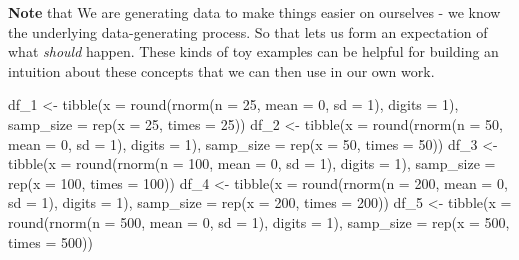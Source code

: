 \documentclass[
]{book}
\newenvironment{Shaded}{\begin{snugshade}}{\end{snugshade}}
\newcommand{\AttributeTok}[1]{\textcolor[rgb]{0.77,0.63,0.00}{#1}}
\newcommand{\DecValTok}[1]{\textcolor[rgb]{0.00,0.00,0.81}{#1}}
\newcommand{\FunctionTok}[1]{\textcolor[rgb]{0.00,0.00,0.00}{#1}}
\newcommand{\NormalTok}[1]{#1}
\newcommand{\OtherTok}[1]{\textcolor[rgb]{0.56,0.35,0.01}{#1}}
\begin{document}
\textbf{Note} that We are generating data to make things easier on ourselves - we know the underlying data-generating process. So that lets us form an expectation of what \emph{should} happen. These kinds of toy examples can be helpful for building an intuition about these concepts that we can then use in our own work.

\begin{Shaded}
\begin{Highlighting}[]
\NormalTok{df\_1 }\OtherTok{\textless{}{-}} \FunctionTok{tibble}\NormalTok{(}\AttributeTok{x =} \FunctionTok{round}\NormalTok{(}\FunctionTok{rnorm}\NormalTok{(}\AttributeTok{n =} \DecValTok{25}\NormalTok{, }\AttributeTok{mean =} \DecValTok{0}\NormalTok{, }\AttributeTok{sd =} \DecValTok{1}\NormalTok{), }\AttributeTok{digits =} \DecValTok{1}\NormalTok{), }\AttributeTok{samp\_size =} \FunctionTok{rep}\NormalTok{(}\AttributeTok{x =} \DecValTok{25}\NormalTok{, }\AttributeTok{times =} \DecValTok{25}\NormalTok{))}
\NormalTok{df\_2 }\OtherTok{\textless{}{-}} \FunctionTok{tibble}\NormalTok{(}\AttributeTok{x =} \FunctionTok{round}\NormalTok{(}\FunctionTok{rnorm}\NormalTok{(}\AttributeTok{n =} \DecValTok{50}\NormalTok{, }\AttributeTok{mean =} \DecValTok{0}\NormalTok{, }\AttributeTok{sd =} \DecValTok{1}\NormalTok{), }\AttributeTok{digits =} \DecValTok{1}\NormalTok{), }\AttributeTok{samp\_size =} \FunctionTok{rep}\NormalTok{(}\AttributeTok{x =} \DecValTok{50}\NormalTok{, }\AttributeTok{times =} \DecValTok{50}\NormalTok{))}
\NormalTok{df\_3 }\OtherTok{\textless{}{-}} \FunctionTok{tibble}\NormalTok{(}\AttributeTok{x =} \FunctionTok{round}\NormalTok{(}\FunctionTok{rnorm}\NormalTok{(}\AttributeTok{n =} \DecValTok{100}\NormalTok{, }\AttributeTok{mean =} \DecValTok{0}\NormalTok{, }\AttributeTok{sd =} \DecValTok{1}\NormalTok{), }\AttributeTok{digits =} \DecValTok{1}\NormalTok{), }\AttributeTok{samp\_size =} \FunctionTok{rep}\NormalTok{(}\AttributeTok{x =} \DecValTok{100}\NormalTok{, }\AttributeTok{times =} \DecValTok{100}\NormalTok{))}
\NormalTok{df\_4 }\OtherTok{\textless{}{-}} \FunctionTok{tibble}\NormalTok{(}\AttributeTok{x =} \FunctionTok{round}\NormalTok{(}\FunctionTok{rnorm}\NormalTok{(}\AttributeTok{n =} \DecValTok{200}\NormalTok{, }\AttributeTok{mean =} \DecValTok{0}\NormalTok{, }\AttributeTok{sd =} \DecValTok{1}\NormalTok{), }\AttributeTok{digits =} \DecValTok{1}\NormalTok{), }\AttributeTok{samp\_size =} \FunctionTok{rep}\NormalTok{(}\AttributeTok{x =} \DecValTok{200}\NormalTok{, }\AttributeTok{times =} \DecValTok{200}\NormalTok{))}
\NormalTok{df\_5 }\OtherTok{\textless{}{-}} \FunctionTok{tibble}\NormalTok{(}\AttributeTok{x =} \FunctionTok{round}\NormalTok{(}\FunctionTok{rnorm}\NormalTok{(}\AttributeTok{n =} \DecValTok{500}\NormalTok{, }\AttributeTok{mean =} \DecValTok{0}\NormalTok{, }\AttributeTok{sd =} \DecValTok{1}\NormalTok{), }\AttributeTok{digits =} \DecValTok{1}\NormalTok{), }\AttributeTok{samp\_size =} \FunctionTok{rep}\NormalTok{(}\AttributeTok{x =} \DecValTok{500}\NormalTok{, }\AttributeTok{times =} \DecValTok{500}\NormalTok{))}
\end{Highlighting}
\end{Shaded}
\end{document}
